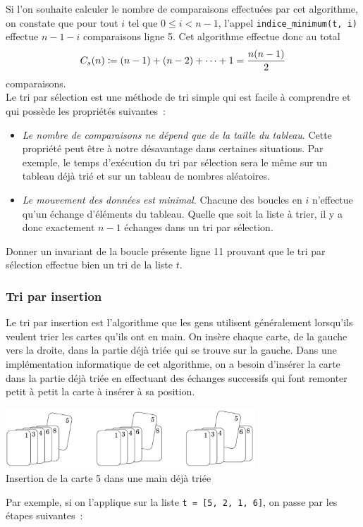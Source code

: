 \documentclass{magnolia}
\begin{document}
Si l'on souhaite calculer le nombre de comparaisons effectuées par cet algorithme, on constate que
pour tout $i$ tel que $0\leq i < n-1$, l'appel \verb!indice_minimum(t, i)! effectue $n-1-i$ comparaisons ligne 5. Cet algorithme effectue donc au total
\[C_s(n)\coloneqq (n-1)+(n-2)+\cdots+1 = \frac{n(n-1)}{2}\]
comparaisons.\\

Le tri par sélection est une méthode de tri simple qui est facile à comprendre et
qui possède les propriétés suivantes~:
\begin{itemize}
\item \emph{Le nombre de comparaisons ne dépend que de la taille du tableau}. Cette
  propriété peut être à notre désavantage dans certaines situations. Par exemple,
  le temps d'exécution du tri par sélection sera le même sur un tableau déjà trié et
  sur un tableau de nombres aléatoires.
\item \emph{Le mouvement des données est minimal}. Chacune des boucles en $i$
  n'effectue qu'un échange d'éléments du tableau. Quelle que soit la liste à trier, il y a donc
  exactement $n-1$ échanges dans un tri par sélection.
\end{itemize}

\begin{exoUnique}
\exo Donner un invariant de la boucle présente ligne 11 prouvant que le tri par sélection
  effectue bien un tri de la liste $t$.
\end{exoUnique}

\subsubsection{Tri par insertion}

Le tri par insertion est l'algorithme que les gens utilisent généralement lorsqu'ils
veulent trier les cartes qu'ils ont en main. On insère chaque carte, de la gauche
vers la droite, dans la partie déjà triée qui se trouve sur la gauche.
Dans une implémentation informatique de cet algorithme, on a besoin d'insérer la carte
dans la partie déjà triée en effectuant des échanges successifs qui font remonter
petit à petit la carte à insérer à sa position.

\begin{center}
\includegraphics[width=0.7\textwidth]{../../Commun/Images/python-cours-insertion_carte}\\
Insertion de la carte 5 dans une main déjà triée
\end{center}
\noindent Par exemple,
si on l'applique sur la liste \verb!t = [5, 2, 1, 6]!, on passe par les étapes
suivantes~: 
\end{document}
